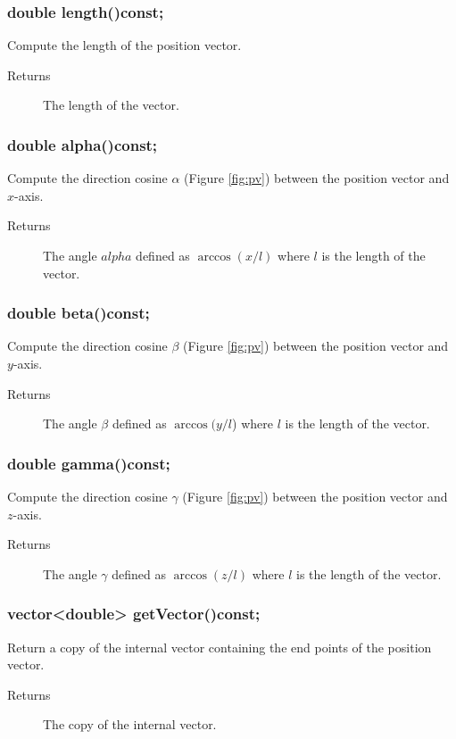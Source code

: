 \subsubsection{double length()const;}
 Compute the length of the position vector.
   \begin{description}
       \item [Returns] The length of the vector.
   \end{description} 

\subsubsection{double alpha()const;} 
Compute the direction cosine $\alpha$ (Figure \ref{fig:pv}) between the position 
vector and $x$-axis.
  \begin{description}
       \item [Returns] The angle $alpha$  defined as $\arccos (x / l)$
                       where $l$ is the length of the vector.
   
  \end{description} 

\subsubsection{double beta()const;} 
Compute the direction cosine $\beta$ (Figure \ref{fig:pv}) between the position 
vector and $y$-axis.
  \begin{description}
       \item [Returns] The angle $\beta$  defined as $\arccos (y / l$)
                       where $l$ is the length of the vector. 
  \end{description} 

\subsubsection{double gamma()const;}
Compute the direction cosine $\gamma$ (Figure \ref{fig:pv}) between the position 
vector and $z$-axis.
  \begin{description}
       \item [Returns] The angle $\gamma$ defined as $\arccos (z / l)$
                       where $l$ is the length of the vector.
  \end{description} 

 
\subsubsection{vector<double> getVector()const;} 
Return a copy of the internal vector containing the end points 
of the position vector. 
  \begin{description}
       \item [Returns] The copy of the internal vector. 
  \end{description} 


